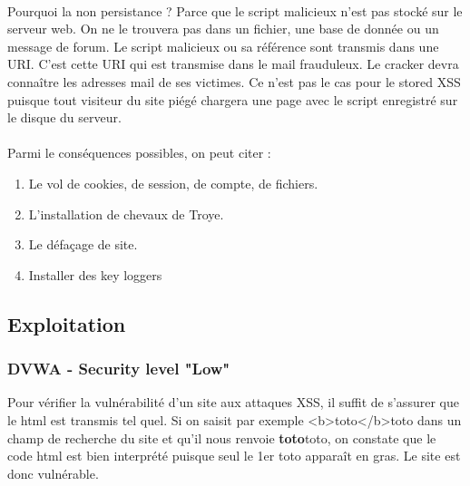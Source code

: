 \paragraph{} Pourquoi la non persistance ? Parce que le script malicieux n'est pas stocké sur le serveur web. On ne le trouvera pas dans un fichier, une base de donnée ou un message de forum. Le script malicieux ou sa référence sont transmis dans une URI. C'est cette URI qui est transmise dans le mail frauduleux. Le cracker devra connaître les adresses mail de ses victimes. Ce n'est pas le cas pour le stored XSS puisque tout visiteur du site piégé chargera une page avec le script enregistré sur le disque du serveur. 



\paragraph{} Parmi le conséquences possibles, on peut citer :
 

\begin{enumerate}
	\item Le vol de cookies, de session, de compte, de fichiers. 
	\item L'installation de chevaux de Troye.
	\item Le défaçage de site.
	\item Installer des key loggers
\end{enumerate}



\subsection{Exploitation}

\subsubsection{DVWA - Security level "Low"}

Pour vérifier la vulnérabilité d'un site aux attaques XSS, il suffit de s'assurer que le html est transmis tel quel. Si on saisit par exemple <b>toto</b>toto dans un champ de recherche du site et qu'il nous renvoie \textbf{toto}toto, on constate que le code html est bien interprété puisque seul le 1er toto apparaît en gras.  Le site est donc vulnérable. 




